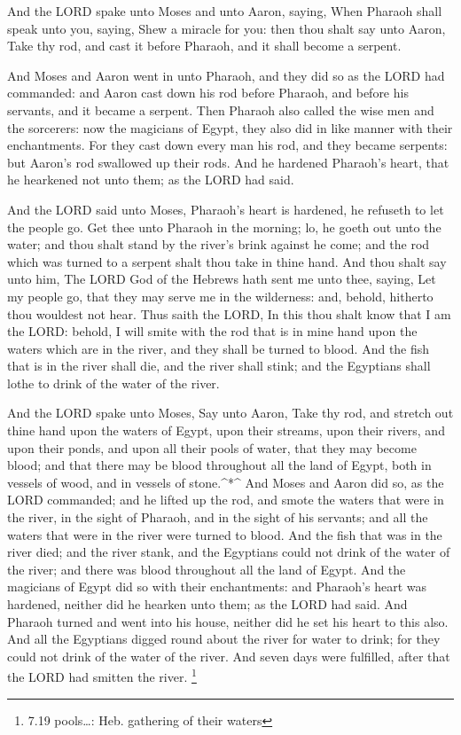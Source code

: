  And the LORD spake unto Moses and unto Aaron, saying,
 When Pharaoh shall speak unto you, saying, Shew a miracle
for you: then thou shalt say unto Aaron, Take thy rod, and cast it
before Pharaoh, and it shall become a serpent.

 And Moses and Aaron went in unto Pharaoh, and they did so
as the LORD had commanded: and Aaron cast down his rod before Pharaoh,
and before his servants, and it became a serpent.  Then
Pharaoh also called the wise men and the sorcerers: now the magicians of
Egypt, they also did in like manner with their enchantments.
 For they cast down every man his rod, and they became
serpents: but Aaron's rod swallowed up their rods.  And he
hardened Pharaoh's heart, that he hearkened not unto them; as the LORD
had said.

 And the LORD said unto Moses, Pharaoh's heart is hardened,
he refuseth to let the people go.  Get thee unto Pharaoh in
the morning; lo, he goeth out unto the water; and thou shalt stand by
the river's brink against he come; and the rod which was turned to a
serpent shalt thou take in thine hand.  And thou shalt say
unto him, The LORD God of the Hebrews hath sent me unto thee, saying,
Let my people go, that they may serve me in the wilderness: and, behold,
hitherto thou wouldest not hear.  Thus saith the LORD, In
this thou shalt know that I am the LORD: behold, I will smite with the
rod that is in mine hand upon the waters which are in the river, and
they shall be turned to blood.  And the fish that is in the
river shall die, and the river shall stink; and the Egyptians shall
lothe to drink of the water of the river.

 And the LORD spake unto Moses, Say unto Aaron, Take thy
rod, and stretch out thine hand upon the waters of Egypt, upon their
streams, upon their rivers, and upon their ponds, and upon all their
pools of water, that they may become blood; and that there may be blood
throughout all the land of Egypt, both in vessels of wood, and in
vessels of stone.\^{}*\^{}  And Moses and Aaron did so, as
the LORD commanded; and he lifted up the rod, and smote the waters that
were in the river, in the sight of Pharaoh, and in the sight of his
servants; and all the waters that were in the river were turned to
blood.  And the fish that was in the river died; and the
river stank, and the Egyptians could not drink of the water of the
river; and there was blood throughout all the land of Egypt.
 And the magicians of Egypt did so with their enchantments:
and Pharaoh's heart was hardened, neither did he hearken unto them; as
the LORD had said.  And Pharaoh turned and went into his
house, neither did he set his heart to this also.  And all
the Egyptians digged round about the river for water to drink; for they
could not drink of the water of the river.  And seven days
were fulfilled, after that the LORD had smitten the river. \footnote{7.19
  pools\ldots: Heb. gathering of their waters}

